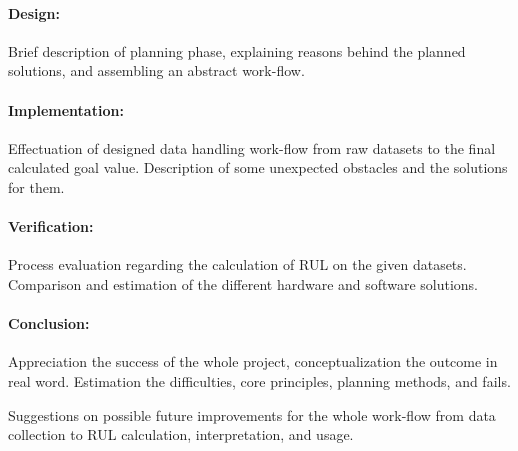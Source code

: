 		\paragraph{Design:}

Brief description of planning phase, explaining reasons behind the planned solutions, and assembling an abstract work-flow.

		\paragraph{Implementation:}

Effectuation of designed data handling work-flow from raw datasets to the final calculated goal value. Description of some unexpected obstacles and the solutions for them.

		\paragraph{Verification:}

Process evaluation regarding the calculation of RUL on the given datasets. Comparison and estimation of the different hardware and software solutions.

		\paragraph{Conclusion:}
Appreciation the success of the whole project, conceptualization the outcome in real word. Estimation the difficulties, core principles, planning methods, and fails.

Suggestions on possible future improvements for the whole work-flow from data collection to RUL calculation, interpretation, and usage.

